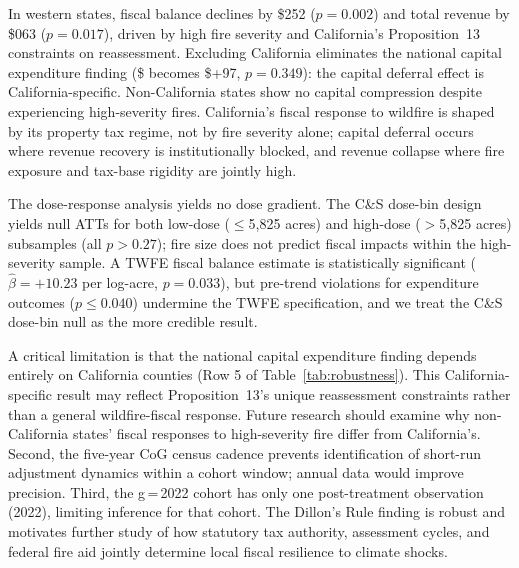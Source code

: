 \documentclass[12pt]{article}
\begin{document}
In western states, fiscal balance declines by \$252 ($p = 0.002$) and total
revenue by \$063 ($p = 0.017$), driven by high fire severity and
California's Proposition~13 constraints on reassessment. Excluding California
eliminates the national capital expenditure finding (\$ becomes \$+97,
$p = 0.349$): the capital deferral effect is California-specific. Non-California
states show no capital compression despite experiencing high-severity fires.
California's fiscal response to wildfire is shaped by its property tax regime,
not by fire severity alone; capital deferral occurs where revenue recovery is
institutionally blocked, and revenue collapse where fire exposure and tax-base
rigidity are jointly high.

The dose-response analysis yields no dose gradient. The C\&S dose-bin design
yields null ATTs for both low-dose ($\leq$5,825 acres) and high-dose ($>$5,825 acres)
subsamples (all $p > 0.27$); fire size does not predict fiscal impacts within the
high-severity sample. A TWFE fiscal balance estimate is statistically significant
($\hat{\beta} = +10.23$ per log-acre, $p = 0.033$), but pre-trend violations for
expenditure outcomes ($p \leq 0.040$) undermine the TWFE specification, and we
treat the C\&S dose-bin null as the more credible result.

A critical limitation is that the national capital expenditure finding depends
entirely on California counties (Row 5 of Table~\ref{tab:robustness}). This
California-specific result may reflect Proposition~13's unique reassessment
constraints rather than a general wildfire-fiscal response. Future research should
examine why non-California states' fiscal responses to high-severity fire differ from
California's. Second, the five-year CoG census cadence prevents identification of
short-run adjustment dynamics within a cohort window; annual data would improve
precision. Third, the g\,=\,2022 cohort has only one post-treatment observation
(2022), limiting inference for that cohort. The Dillon's Rule finding is robust and
motivates further study of how statutory tax authority, assessment cycles, and
federal fire aid jointly determine local fiscal resilience to climate shocks.

\clearpage

\end{document}
